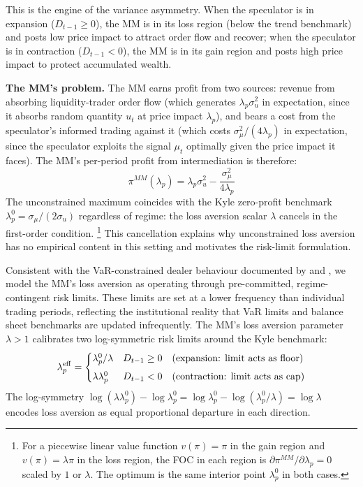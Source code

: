 \documentclass[12pt,a4paper]{article}
\theoremstyle{definition}
\begin{document}
\noindent
This is the engine of the variance asymmetry. When the speculator is in
expansion ($D_{t-1} \geq 0$), the MM is in its loss region (below the
trend benchmark) and posts low price impact to attract order flow and
recover; when the speculator is in contraction ($D_{t-1} < 0$), the MM
is in its gain region and posts high price impact to protect accumulated
wealth.

\noindent\textbf{The MM's problem.}
The MM earns profit from two sources: revenue from absorbing
liquidity-trader order flow (which generates $\lambda_p\sigma^2_u$ in
expectation, since it absorbs random quantity $u_t$ at price impact
$\lambda_p$), and bears a cost from the speculator's informed trading
against it (which costs $\sigma^2_\mu/(4\lambda_p)$ in expectation,
since the speculator exploits the signal $\mu_t$ optimally given the
price impact it faces). The MM's per-period profit from intermediation
is therefore:
\begin{equation}
  \pi^{MM}(\lambda_p) = \lambda_p\sigma^2_u - \frac{\sigma^2_\mu}{4\lambda_p}
  \label{eq:mm_profit}
\end{equation}
The unconstrained maximum coincides with the Kyle zero-profit benchmark
$\lambda^0_p = \sigma_\mu/(2\sigma_u)$ regardless of regime: the loss
aversion scalar $\lambda$ cancels in the first-order condition.%
\footnote{For a piecewise linear value function $v(\pi) = \pi$ in the
gain region and $v(\pi) = \lambda\pi$ in the loss region, the FOC in
each region is $\partial\pi^{MM}/\partial\lambda_p = 0$ scaled by $1$
or $\lambda$. The optimum is the same interior point $\lambda^0_p$ in
both cases.}
This cancellation explains why unconstrained loss aversion has no
empirical content in this setting and motivates the risk-limit
formulation.

Consistent with the VaR-constrained dealer behaviour documented by
\citet{adrian2014} and \citet{li2025}, we model the MM's loss aversion
as operating through pre-committed, regime-contingent risk limits.
These limits are set at a lower frequency than individual trading
periods, reflecting the institutional reality that VaR limits and balance
sheet benchmarks are updated infrequently. The MM's loss aversion
parameter $\lambda > 1$ calibrates two log-symmetric risk limits around
the Kyle benchmark:
\begin{equation}
  \lambda^{\rm eff}_p =
  \begin{cases}
    \lambda^0_p/\lambda
      & D_{t-1} \geq 0 \quad\text{(expansion: limit acts as floor)} \\[4pt]
    \lambda\lambda^0_p
      & D_{t-1} < 0 \quad\text{(contraction: limit acts as cap)}
  \end{cases}
  \label{eq:risk_limits}
\end{equation}
The log-symmetry $\log(\lambda\lambda^0_p) - \log\lambda^0_p =
\log\lambda^0_p - \log(\lambda^0_p/\lambda) = \log\lambda$ encodes loss
aversion as equal proportional departure in each direction.
\end{document}
